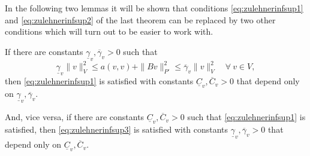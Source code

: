 In the following two lemmas it will be shown that conditions \eqref{eq:zulehnerinfsup1} and \eqref{eq:zulehnerinfsup2} of the
last theorem can be replaced by two other conditions which will turn out to be easier to work with.

\begin{lemma}
If there are constants $\underline{\gamma}_v, \overline{\gamma}_v>0$ such that
\begin{equation}\label{eq:zulehnerinfsup3}
\underline{\gamma}_v\|v\|_V^2\leq a(v,v)+\|Bv\|_{P'}^2\leq\overline{\gamma}_v\|v\|_V^2\quad\forall~v\in V,
\end{equation}
then \eqref{eq:zulehnerinfsup1} is satisfied with constants $\underline{C}_v, \overline{C}_v>0$ that depend only on $\underline{\gamma}_v, \overline{\gamma}_v$.

And, vice versa, if there are constants $\underline{C}_v, \overline{C}_v>0$ such that \eqref{eq:zulehnerinfsup1} is satisfied, then \eqref{eq:zulehnerinfsup3} is satisfied with constants $\underline{\gamma}_v, \overline{\gamma}_v>0$ that depend only on $\underline{C}_v, \overline{C}_v$.
\end{lemma}
